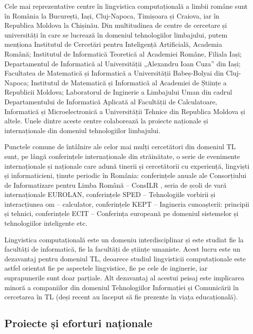 \begin{multicols}{2}
Cele mai reprezentative centre în lingvistica computațională a limbii române sunt în România la București, Iași, Cluj-Napoca, Timișoara și Craiova, iar în Republica Moldova la Chișinău. Din multitudinea de centre de cercetare și universități în care se lucrează în domeniul tehnologiilor limbajului, putem menționa Institutul de Cercetări pentru Inteligență Artificială, Academia Română; Institutul de Informatică Teoretică al Academiei Române, Filiala Iași; Departamentul de Informatică al Universității „Alexandru Ioan Cuza” din Iași; Facultatea de Matematică și Informatică a Universității Babeș-Bolyai din Cluj-Napoca; Institutul de Matematică și Informatică al Academiei de Științe a Republicii Moldova; Laboratorul de Inginerie a Limbajului Uman din cadrul Departamentului de Informatică Aplicată al Facultății de Calculatoare, Informatică și Microelectronică a Universității Tehnice din Republica Moldova și altele. Unele dintre aceste centre colaborează la proiecte naționale și internaționale din domeniul tehnologiilor limbajului. 

Punctele comune de întâlnire ale celor mai mulți cercetători din domeniul TL sunt, pe lângă conferințele internaționale din străinătate, o serie de evenimente internaționale și naționale care adună tinerii și cercetătorii cu experiență, lingviști și informaticieni, ținute periodic în România: conferințele anuale ale Consorțiului de Informatizare pentru Limba Română – ConsILR \cite{consilr}, seria de școli de vară internaționale EUROLAN, conferințele SPED – Tehnologiile vorbirii și interacțiunea om – calculator, conferințele KEPT – Ingineria cunoașterii: principii și tehnici, conferințele ECIT – Conferința europeană pe domeniul sistemelor și tehnologiilor inteligente etc.

Lingvistica computațională este un domeniu interdisciplinar și este studiat fie la facultăți de informatică, fie la facultăți de științe umaniste. Acest lucru este un dezavantaj pentru domeniul TL, deoarece studiul lingvisticii computaționale este astfel orientat fie pe aspectele lingvistice, fie pe cele de inginerie, iar suprapunerile sunt doar parțiale. Alt dezavantaj al acestui peisaj este implicarea minoră a companiilor din domeniul Tehnologiilor Informației și Comunicării în cercetarea în TL (deși recent au început să fie prezente în viața educațională).

\subsection{Proiecte și eforturi naționale}


\end{multicols}
